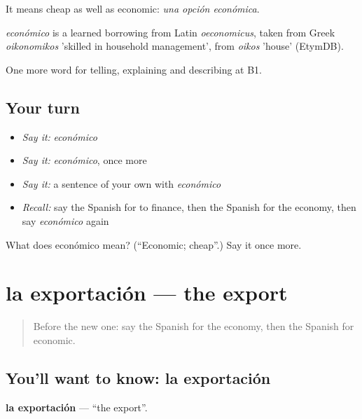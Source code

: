 It means cheap as well as economic: \emph{una opción económica}.

\begin{cousinweb}
\emph{económico} is a learned borrowing from Latin \emph{oeconomicus}, taken from Greek \emph{oikonomikos} 'skilled in household management', from \emph{oikos} 'house' (EtymDB).
\end{cousinweb}

\begin{grammarlens}[title={What you've built}]
One more word for telling, explaining and describing at B1.
\end{grammarlens}

\subsection*{Your turn}
\begin{itemize}
\raggedright
  \item \emph{Say it:} \emph{económico}
  \item \emph{Say it:} \emph{económico}, once more
  \item \emph{Say it:} a sentence of your own with \emph{económico}
  \item \emph{Recall:} say the Spanish for to finance, then the Spanish for the economy, then say \emph{económico} again
\end{itemize}

\begin{tcolorbox}[breakable,colback=teal!4,colframe=teal!35!black,title={Before you move on}]
What does económico mean? (\textquotedblleft{}Economic; cheap\textquotedblright{}.) Say it once more.
\end{tcolorbox}
\section[la exportación]{la exportación — the export}

\label{lesson:ES-C630-exportacion}



\begin{quote}
Before the new one: say the Spanish for the economy, then the Spanish for economic.
\end{quote}

\subsection*{You'll want to know: la exportación}
\textbf{la exportación} — \textquotedblleft{}the export\textquotedblright{}.

